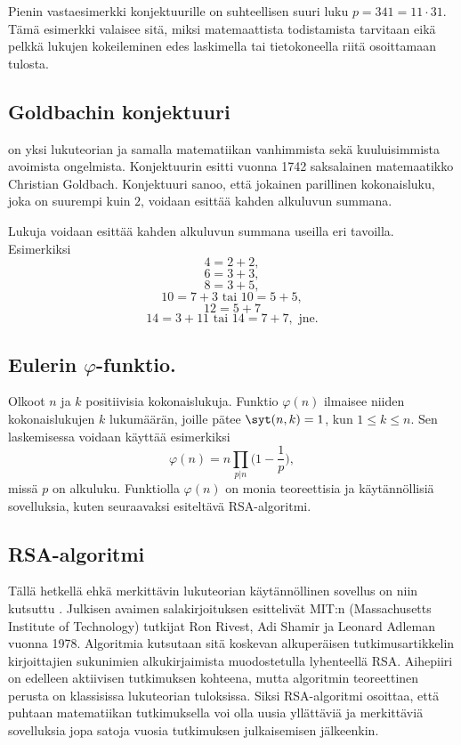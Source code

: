 Pienin vastaesimerkki konjektuurille on suhteellisen suuri luku $p=341 = 11\cdot 31$. Tämä esimerkki valaisee sitä, miksi matemaattista todistamista tarvitaan eikä pelkkä lukujen kokeileminen edes laskimella tai tietokoneella riitä osoittamaan tulosta.


\subsection*{Goldbachin konjektuuri}
 on yksi lukuteorian ja samalla matematiikan vanhimmista sekä kuuluisimmista avoimista ongelmista. Konjektuurin esitti vuonna 1742 saksalainen mate\-maa\-tik\-ko Christian Goldbach. Konjektuuri sanoo, että jokainen parillinen kokonaisluku, joka on suurempi kuin $2$, voidaan esittää kahden alkuluvun summana. 

Lukuja voidaan esittää kahden alkuluvun summana useilla eri tavoilla. Esimerkiksi
\[
  4 = 2 + 2,
\]
\[
  6 = 3 + 3,
\]
\[
  8 = 3 + 5,
\]
\[
10 = 7 + 3\textrm{ tai } 10=5 + 5,
\]
\[
12 = 5 + 7
\]
\[
14 = 3 + 11\textrm{ tai }14 =7 + 7, \textrm{ jne.}
\]

\subsection*{Eulerin $\varphi$-funktio.} 
Olkoot $n$ ja $k$ positiivisia kokonaislukuja. Funktio $\varphi(n)$ ilmaisee niiden kokonaislukujen $k$ lukumäärän, joille pätee 
$\syt(n, k) = 1$, kun $1\le k \le n$. Sen laskemisessa voidaan käyttää esimerkiksi 
\[
\varphi(n)=n \prod_{p|n} \bigg(1-\frac{1}{p}\bigg),
\]
missä $p$ on alkuluku. Funktiolla $\varphi(n)$ on monia teoreettisia ja käy\-tän\-nöl\-li\-siä sovelluksia, kuten seuraavaksi esiteltävä RSA-algoritmi.

\subsection*{RSA-algoritmi} Tällä hetkellä ehkä merkittävin lukuteorian käy\-tän\-nöl\-li\-nen sovellus on niin kutsuttu . Julkisen avaimen salakirjoituksen esittelivät MIT:n (Massachusetts Institute of Technology) tutkijat Ron Rivest, Adi Shamir ja Leonard Adleman vuonna 1978. Algoritmia kutsutaan sitä koskevan alkuperäisen tutkimusartikkelin kirjoittajien sukunimien alkukirjaimista muodostetulla lyhenteellä RSA. Aihepiiri on edelleen aktiivisen tutkimuksen kohteena, mutta algoritmin teoreettinen perusta on klassisissa lukuteorian tuloksissa. Siksi RSA-algoritmi osoittaa, että puhtaan matematiikan tutkimuksella voi olla uusia yllättäviä ja merkittäviä sovelluksia jopa satoja vuosia tutkimuksen julkaisemisen jälkeenkin.

